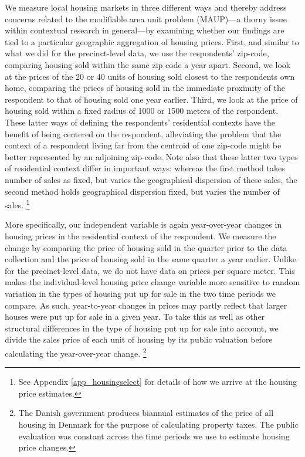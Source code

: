 \documentclass[12pt,a4paper]{article}
\begin{document}
	We measure local housing markets in three different ways and thereby address concerns related to the modifiable area unit problem (MAUP)—a thorny issue within contextual research in general—by examining whether our findings are tied to a particular geographic aggregation of housing prices. First, and similar to what we did for the precinct-level data, we use the respondents’ zip-code, comparing housing sold within the same zip code a year apart. Second, we look at the prices of the 20 or 40 units of housing sold closest to the respondents own home, comparing the prices of housing sold in the immediate proximity of the respondent to that of housing sold one year earlier. Third, we look at the price of housing sold within a fixed radius of 1000 or 1500 meters of the respondent. These latter ways of defining the respondents’ residential contexts have the benefit of being centered on the respondent, alleviating the problem that the context of a respondent living far from the centroid of one zip-code might be better represented by an adjoining zip-code. Note also that these latter two types of residential context differ in important ways: whereas the first method takes number of sales as fixed, but varies the geographical dispersion of these sales, the second method holds geographical dispersion fixed, but varies the number of sales. \footnote{See Appendix \ref{app_housingselect} for details of how we arrive at the housing price estimates.}
	
	More specifically, our independent variable is again year-over-year changes in housing prices in the residential context of the respondent. We measure the change by comparing the price of housing sold in the quarter prior to the data collection and the price of housing sold in the same quarter a year earlier. Unlike for the precinct-level data, we do not have data on prices per square meter. This makes the individual-level housing price change variable more sensitive to random variation in the types of housing put up for sale in the two time periods we compare. As such, year-to-year changes in prices may partly reflect that larger houses were put up for sale in a given year. To take this as well as other structural differences in the type of housing put up for sale into account, we divide the sales price of each unit of housing by its public valuation before calculating the year-over-year change. \footnote{The Danish government produces biannual estimates of the price of all housing in Denmark for the purpose of calculating property taxes. The public evaluation was constant across the time periods we use to estimate housing price changes.}
	
\end{document}
